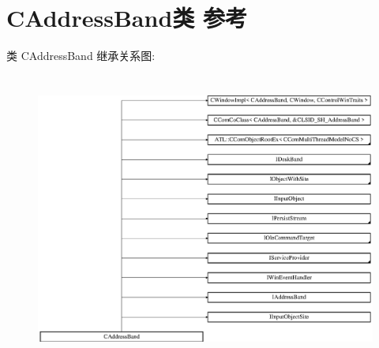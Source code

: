 \hypertarget{class_c_address_band}{}\section{C\+Address\+Band类 参考}
\label{class_c_address_band}
类 C\+Address\+Band 继承关系图\+:\begin{figure}[H]
\begin{center}
\leavevmode
\includegraphics[height=9.655172cm]{class_c_address_band}
\end{center}
\end{figure}
